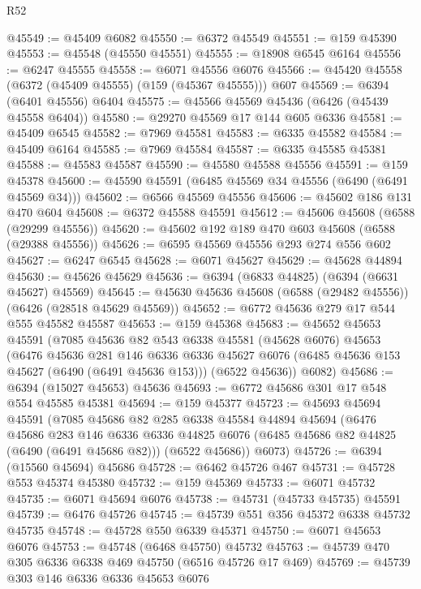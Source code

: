 \begin{lexlean}{R52}
\begin{coremodule}
@45549 := @45409 @6082
@45550 := @6372 @45549
@45551 := @159 @45390
@45553 := @45548 (@45550 @45551)
@45555 := @18908 @6545 @6164
@45556 := @6247 @45555
@45558 := @6071 @45556 @6076
@45566 := @45420 @45558 (@6372 (@45409 @45555) (@159 (@45367 @45555))) @607
@45569 := @6394 (@6401 @45556) @6404
@45575 := @45566 @45569 @45436 (@6426 (@45439 @45558 @6404))
@45580 := @29270 @45569 @17 @144 @605 @6336
@45581 := @45409 @6545
@45582 := @7969 @45581
@45583 := @6335 @45582
@45584 := @45409 @6164
@45585 := @7969 @45584
@45587 := @6335 @45585 @45381
@45588 := @45583 @45587
@45590 := @45580 @45588 @45556
@45591 := @159 @45378
@45600 := @45590 @45591 (@6485 @45569 @34 @45556 (@6490 (@6491 @45569 @34)))
@45602 := @6566 @45569 @45556
@45606 := @45602 @186 @131 @470 @604
@45608 := @6372 @45588 @45591
@45612 := @45606 @45608 (@6588 (@29299 @45556))
@45620 := @45602 @192 @189 @470 @603 @45608 (@6588 (@29388 @45556))
@45626 := @6595 @45569 @45556 @293 @274 @556 @602
@45627 := @6247 @6545
@45628 := @6071 @45627
@45629 := @45628 @44894
@45630 := @45626 @45629
@45636 := @6394 (@6833 @44825) (@6394 (@6631 @45627) @45569)
@45645 := @45630 @45636 @45608 (@6588 (@29482 @45556)) (@6426 (@28518 @45629 @45569))
@45652 := @6772 @45636 @279 @17 @544 @555 @45582 @45587
@45653 := @159 @45368
@45683 := @45652
    @45653
    @45591
    (@7085
      @45636
      @82
      @543
      @6338
      @45581
      (@45628 @6076)
      @45653
      (@6476
        @45636
        @281
        @146
        @6336
        @6336
        @45627
        @6076
        (@6485 @45636 @153 @45627 (@6490 (@6491 @45636 @153)))
        (@6522 @45636))
      @6082)
@45686 := @6394 (@15027 @45653) @45636
@45693 := @6772 @45686 @301 @17 @548 @554 @45585 @45381
@45694 := @159 @45377
@45723 := @45693
    @45694
    @45591
    (@7085
      @45686
      @82
      @285
      @6338
      @45584
      @44894
      @45694
      (@6476
        @45686
        @283
        @146
        @6336
        @6336
        @44825
        @6076
        (@6485 @45686 @82 @44825 (@6490 (@6491 @45686 @82)))
        (@6522 @45686))
      @6073)
@45726 := @6394 (@15560 @45694) @45686
@45728 := @6462 @45726 @467
@45731 := @45728 @553 @45374 @45380
@45732 := @159 @45369
@45733 := @6071 @45732
@45735 := @6071 @45694 @6076
@45738 := @45731 (@45733 @45735) @45591
@45739 := @6476 @45726
@45745 := @45739 @551 @356 @45372 @6338 @45732 @45735
@45748 := @45728 @550 @6339 @45371
@45750 := @6071 @45653 @6076
@45753 := @45748 (@6468 @45750) @45732
@45763 := @45739 @470 @305 @6336 @6338 @469 @45750 (@6516 @45726 @17 @469)
@45769 := @45739 @303 @146 @6336 @6336 @45653 @6076

\end{coremodule}
\end{lexlean}
